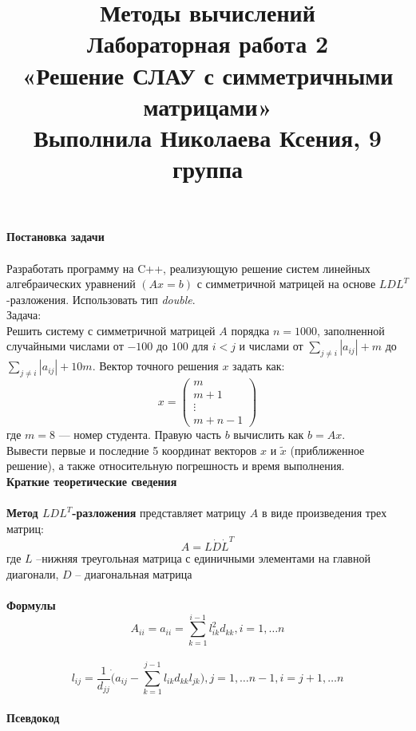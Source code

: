\documentclass[a4paper, 12pt]{report}
\title{\textbf{\Huge{Методы вычислений}}\\Лабораторная работа 2\\«Решение СЛАУ с симметричными матрицами»\\Выполнила Николаева Ксения, 9 группа}
\date{}
\begin{document}
    \maketitle

    \textbf{\Huge{Постановка задачи}}\\\\
        Разработать программу на C++, реализующую решение систем линейных алгебраических уравнений $( Ax = b )$ с симметричной матрицей на основе $LDL^T$-разложения. Использовать тип \textit{double}.\\
    Задача:\\
    Решить систему с симметричной матрицей $A$ порядка $n = 1000$, заполненной случайными числами от $-100$ до $100$ для $i < j$ и числами от $\sum_{j \neq i}|a_{ij}| + m$ до $\sum_{j \neq i}|a_{ij}| + 10m$.  Вектор точного решения $x$ задать как:
    \[
   x = \begin{pmatrix}
   m \\
   m + 1 \\
   \vdots \\
   m + n - 1
   \end{pmatrix}
   \]
   где $m = 8$ — номер студента. Правую часть $b$ вычислить как $b = Ax$.\\ 
   Вывести первые и последние 5 координат векторов $x$ и $ \tilde{x}$ (приближенное решение), а также относительную погрешность и время выполнения.\\
   

   \newpage
   \textbf{\Huge{Краткие теоретические сведения}}\\\\
   \textbf{Метод $LDL^T$-разложения} представляет матрицу $A$ в виде произведения трех матриц: $$A = L \dot D \dot L^T$$ где $L$ --нижняя треугольная матрица с единичными элементами на главной диагонали,  $D$ -- диагональная матрица\\\\
   \textbf{Формулы}
   $$A_{ii} = a_{ii} = \sum_{k = 1}^{i - 1}l_{ik}^2d_{kk}, i = 1, \dots n$$\\
   $$l_{ij} = \dfrac{1}{d_{jj}} \dot (a_{ij} - \sum_{k = 1}^{j - 1}l_{ik}  d_{kk}  l_{jk}), j = 1, \dots n - 1, i = j + 1, \dots n$$\\
   \textbf{Псевдокод}
\end{document}
